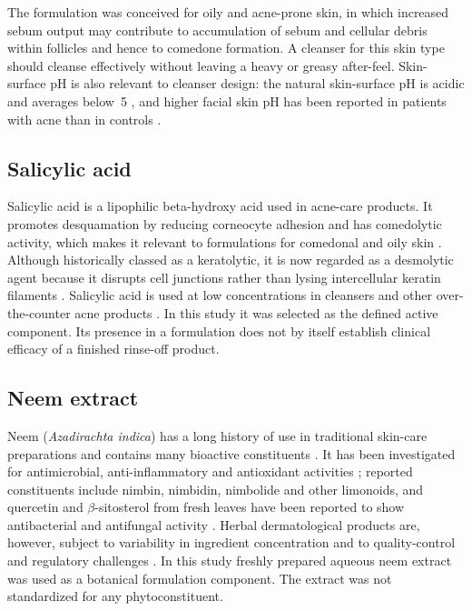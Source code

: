\documentclass[10pt,a4paper,twocolumn]{article}
\begin{document}
The formulation was conceived for oily and acne-prone skin, in which
increased sebum output may contribute to accumulation of sebum and
cellular debris within follicles and hence to comedone formation. A
cleanser for this skin type should cleanse effectively without leaving a
heavy or greasy after-feel. Skin-surface pH is also relevant to cleanser
design: the natural skin-surface pH is acidic and averages below~5
\citep{lambers2006}, and higher facial skin pH has been reported in
patients with acne than in controls \citep{prakash2017}.

\subsection{Salicylic acid}

Salicylic acid is a lipophilic beta-hydroxy acid used in acne-care
products. It promotes desquamation by reducing corneocyte adhesion and
has comedolytic activity, which makes it relevant to formulations for
comedonal and oily skin \citep{decker2012,arif2015}. Although
historically classed as a keratolytic, it is now regarded as a
desmolytic agent because it disrupts cell junctions rather than lysing
intercellular keratin filaments \citep{arif2015}. Salicylic acid is used
at low concentrations in cleansers and other over-the-counter acne
products \citep{decker2012,arif2015}. In this study it was selected as
the defined active component. Its presence in a formulation does not by
itself establish clinical efficacy of a finished rinse-off product.

\subsection{Neem extract}

Neem (\textit{Azadirachta indica}) has a long history of use in
traditional skin-care preparations and contains many bioactive
constituents \citep{singh2021,kumar2013,gupta2017}. It has been
investigated for antimicrobial, anti-inflammatory and antioxidant
activities \citep{singh2021,kumar2013,gupta2017,alzohairy2016}; reported
constituents include nimbin, nimbidin, nimbolide and other limonoids, and
quercetin and $\beta$-sitosterol from fresh leaves have been reported to
show antibacterial and antifungal activity \citep{alzohairy2016}. Herbal
dermatological products are, however, subject to variability in
ingredient concentration and to quality-control and regulatory challenges
\citep{brar2025}. In this study freshly prepared aqueous neem extract
was used as a botanical formulation component. The extract was not
standardized for any phytoconstituent.
\end{document}
